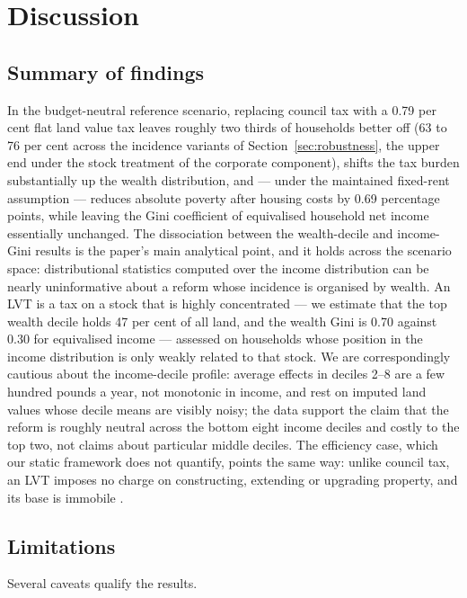 \section{Discussion}
\label{sec:discussion}

\subsection{Summary of findings}

In the budget-neutral reference scenario, replacing council tax with a 0.79 per cent flat land value tax leaves roughly two thirds of households better off (63 to 76 per cent across the incidence variants of Section~\ref{sec:robustness}, the upper end under the stock treatment of the corporate component), shifts the tax burden substantially up the wealth distribution, and --- under the maintained fixed-rent assumption --- reduces absolute poverty after housing costs by 0.69 percentage points, while leaving the Gini coefficient of equivalised household net income essentially unchanged. The dissociation between the wealth-decile and income-Gini results is the paper's main analytical point, and it holds across the scenario space: distributional statistics computed over the income distribution can be nearly uninformative about a reform whose incidence is organised by wealth. An LVT is a tax on a stock that is highly concentrated --- we estimate that the top wealth decile holds 47 per cent of all land, and the wealth Gini is 0.70 against 0.30 for equivalised income --- assessed on households whose position in the income distribution is only weakly related to that stock. We are correspondingly cautious about the income-decile profile: average effects in deciles 2--8 are a few hundred pounds a year, not monotonic in income, and rest on imputed land values whose decile means are visibly noisy; the data support the claim that the reform is roughly neutral across the bottom eight income deciles and costly to the top two, not claims about particular middle deciles. The efficiency case, which our static framework does not quantify, points the same way: unlike council tax, an LVT imposes no charge on constructing, extending or upgrading property, and its base is immobile \citep{george1879, oates1997}.

\subsection{Limitations}

Several caveats qualify the results.

